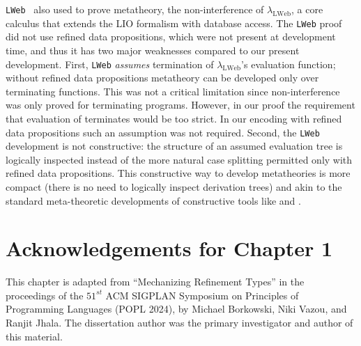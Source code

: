 \texttt{LWeb}~\cite{lweb} also used \lh 
to prove metatheory, %
the non-interference of $\lambda_{\text{LWeb}}$,
a core calculus that extends the LIO formalism with database access. 
The \texttt{LWeb} proof did not use refined data propositions, 
which were not present at development time,
and thus it has two major weaknesses compared to our 
present development. 
First, \texttt{LWeb}
\textit{assumes} termination of $\lambda_{\text{LWeb}}$'s evaluation function; 
without refined data propositions metatheory can be developed only over 
terminating functions. 
This was not a critical limitation since non-interference was only 
proved for terminating programs. 
However, in our proof the requirement that evaluation of \sysrf terminates 
would be too strict. 
In our encoding with refined data propositions
such an assumption was not required. 
Second, the \texttt{LWeb} development is not constructive: 
the structure of an assumed evaluation tree is logically inspected 
instead of the more natural case splitting permitted only with 
refined data propositions. 
This constructive way to develop metatheories is more compact 
(\eg there is no need to logically inspect 
derivation trees) and akin to the standard 
meta-theoretic developments of constructive tools like 
\coq and \isabelle. 


\section*{Acknowledgements for Chapter 1}
%
This chapter is adapted from 
``Mechanizing Refinement Types'' in the proceedings of the 
$51^{st}$ ACM SIGPLAN Symposium on Principles of Programming
Languages (POPL 2024), by Michael Borkowski, Niki Vazou, and
Ranjit Jhala.
%
The dissertation author was the primary investigator 
and author of this material.